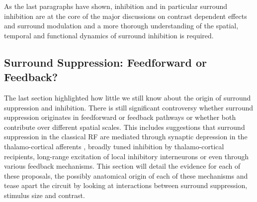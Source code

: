 
As the last paragraphs have shown, inhibition and in particular
surround inhibition are at the core of the major discussions on
contrast dependent effects and surround modulation and a more thorough
understanding of the spatial, temporal and functional dynamics of
surround inhibition is required.

\subsection{Surround Suppression: Feedforward or Feedback?}

The last section highlighted how little we still know about the origin
of surround suppression and inhibition. There is still significant
controversy whether surround suppression originates in feedforward or
feedback pathways or whether both contribute over different spatial
scales. This includes suggestions that surround suppression in the
classical RF are mediated through synaptic depression in the
thalamo-cortical afferents \citep{Carandini2002}, broadly tuned
inhibition by thalamo-cortical recipients, long-range excitation of
local inhibitory interneurons or even through various feedback
mechanisms. This section will detail the evidence for each of these
proposals, the possibly anatomical origin of each of these mechanisms
and tease apart the circuit by looking at interactions between
surround suppression, stimulus size and contrast.

